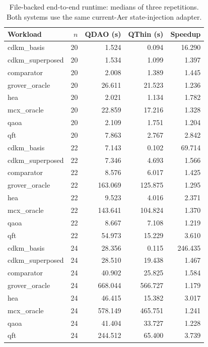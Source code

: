 \begin{table}[t]
\centering
\small
\caption{File-backed end-to-end runtime: medians of three repetitions. Both systems use the same current-Aer state-injection adapter.}
\label{tab:qdao-qthin-runtime}
\begin{tabular}{lrrrr}
\hline
Workload & $n$ & QDAO (s) & QThin (s) & Speedup \\
\hline
cdkm\_basis & 20 & 1.524 & 0.094 & 16.290 \\
cdkm\_superposed & 20 & 1.534 & 1.099 & 1.397 \\
comparator & 20 & 2.008 & 1.389 & 1.445 \\
grover\_oracle & 20 & 26.611 & 21.523 & 1.236 \\
hea & 20 & 2.021 & 1.134 & 1.782 \\
mcx\_oracle & 20 & 22.859 & 17.216 & 1.328 \\
qaoa & 20 & 2.109 & 1.751 & 1.204 \\
qft & 20 & 7.863 & 2.767 & 2.842 \\
cdkm\_basis & 22 & 7.143 & 0.102 & 69.714 \\
cdkm\_superposed & 22 & 7.346 & 4.693 & 1.566 \\
comparator & 22 & 8.576 & 6.017 & 1.425 \\
grover\_oracle & 22 & 163.069 & 125.875 & 1.295 \\
hea & 22 & 9.523 & 4.016 & 2.371 \\
mcx\_oracle & 22 & 143.641 & 104.824 & 1.370 \\
qaoa & 22 & 8.667 & 7.108 & 1.219 \\
qft & 22 & 54.973 & 15.229 & 3.610 \\
cdkm\_basis & 24 & 28.356 & 0.115 & 246.435 \\
cdkm\_superposed & 24 & 28.510 & 19.438 & 1.467 \\
comparator & 24 & 40.902 & 25.825 & 1.584 \\
grover\_oracle & 24 & 668.044 & 566.727 & 1.179 \\
hea & 24 & 46.415 & 15.382 & 3.017 \\
mcx\_oracle & 24 & 578.149 & 465.751 & 1.241 \\
qaoa & 24 & 41.404 & 33.727 & 1.228 \\
qft & 24 & 244.512 & 65.400 & 3.739 \\
\hline
\end{tabular}
\end{table}

